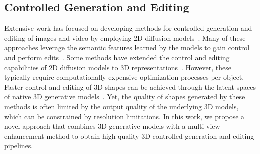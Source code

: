 \vspace{-2pt}
\subsection{Controlled Generation and Editing}
\vspace{-2pt}
Extensive work has focused on developing methods for controlled generation and editing of images and video by employing 2D diffusion models~\cite{mokady2023null, garibi2024renoise, Avrahami_2022_CVPR, wu2024turboedit, deutch2024turboedittextbasedimageediting, huberman2024edit, brooks2022instructpix2pix, zhang2023adding, li2023gligen, avrahami2023spatext,cohen2024sliceditzeroshotvideoediting}. Many of these approaches leverage the semantic features learned by the models to gain control and perform edits~\cite{zhang2023adding, hertz2022prompt, Tumanyan_2023_CVPR, patashnik2023localizing, Cao_2023_ICCV, parmar2023zero}.
Some methods have extended the control and editing capabilities of 2D diffusion models to 3D representations~\cite{haque2023instructnerf2nerfediting3dscenes, koo2024posteriordistillationsampling, patashnik2024consolidating, li2023diffusionsdftexttoshapevoxelizeddiffusion, bhat2023loosecontrol, mvedit2024}. However, these typically require computationally expensive optimization processes per object. Faster control and editing of 3D shapes can be achieved through the latent spaces of native 3D generative models~\cite{sella2024spicee, sella2023vox, chen2023shapeditor, hu2023neuralwaveletdomaindiffusion3d, liu2023meshdiffusionscorebasedgenerative3d}. Yet, the quality of shapes generated by these methods is often limited by the output quality of the underlying 3D models, which can be constrained by resolution limitations.
In this work, we propose a novel approach that combines 3D generative models with a multi-view enhancement method to obtain high-quality 3D controlled generation and editing pipelines.

